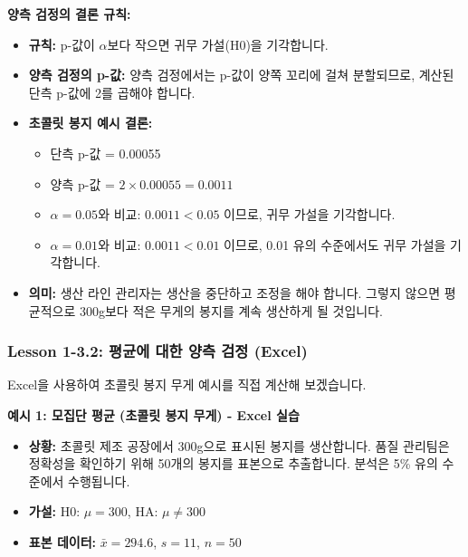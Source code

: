 \documentclass[11pt,a4paper]{article}
\theoremstyle{definition}
\begin{document}
\begin{summarybox}
\textbf{양측 검정의 결론 규칙:}
\begin{itemize}
    \item \textbf{규칙:} p-값이 $\alpha$보다 작으면 귀무 가설(H0)을 기각합니다.
    \item \textbf{양측 검정의 p-값:} 양측 검정에서는 p-값이 양쪽 꼬리에 걸쳐 분할되므로, 계산된 단측 p-값에 2를 곱해야 합니다.
    \item \textbf{초콜릿 봉지 예시 결론:}
        \begin{itemize}
            \item 단측 p-값 = 0.00055
            \item 양측 p-값 = $2 \times 0.00055 = 0.0011$
            \item $\alpha = 0.05$와 비교: $0.0011 < 0.05$ 이므로, 귀무 가설을 기각합니다.
            \item $\alpha = 0.01$와 비교: $0.0011 < 0.01$ 이므로, 0.01 유의 수준에서도 귀무 가설을 기각합니다.
        \end{itemize}
    \item \textbf{의미:} 생산 라인 관리자는 생산을 중단하고 조정을 해야 합니다. 그렇지 않으면 평균적으로 300g보다 적은 무게의 봉지를 계속 생산하게 될 것입니다.
\end{itemize}
\end{summarybox}

\newpage
\subsubsection{Lesson 1-3.2: 평균에 대한 양측 검정 (Excel)}

Excel을 사용하여 초콜릿 봉지 무게 예시를 직접 계산해 보겠습니다.

\begin{examplebox}
\textbf{예시 1: 모집단 평균 (초콜릿 봉지 무게) - Excel 실습}
\begin{itemize}
    \item \textbf{상황:} 초콜릿 제조 공장에서 300g으로 표시된 봉지를 생산합니다. 품질 관리팀은 정확성을 확인하기 위해 50개의 봉지를 표본으로 추출합니다. 분석은 5\% 유의 수준에서 수행됩니다.
    \item \textbf{가설:} H0: $\mu = 300$, HA: $\mu \ne 300$
    \item \textbf{표본 데이터:} $\bar{x} = 294.6$, $s = 11$, $n = 50$
\end{itemize}
\end{examplebox}
\end{document}
